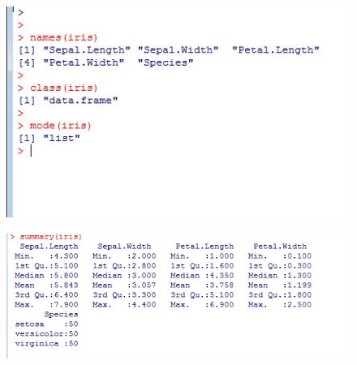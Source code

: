 \documentclass{beamer}
\begin{document}
 	
 	\begin{frame}
 		\begin{figure}  
 			\includegraphics[width=0.7\linewidth]{images/irisinspect}     
 		\end{figure}
 	\end{frame}   
 	\begin{frame}
\begin{figure}
\centering
\includegraphics[width=0.7\linewidth]{images/irissummary}
\caption{}
\label{fig:irissummary}
\end{figure}
 	\end{frame}   
 	
\end{document}
